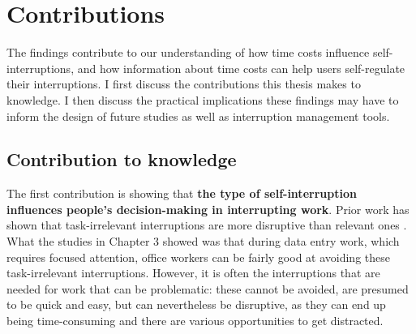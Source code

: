 \section{Contributions}
The findings contribute to our understanding of how time costs influence self-interruptions, and how information about time costs can help users self-regulate their interruptions. I first discuss the contributions this thesis makes to knowledge. I then discuss the practical implications these findings may have to inform the design of future studies as well as interruption management tools. 






\subsection{Contribution to knowledge}
The first contribution is showing that \textbf{the type of self-interruption influences people’s decision-making in interrupting work}. Prior work has shown that task-irrelevant interruptions are more disruptive than relevant ones \citep{Iqbal2008}. What the studies in Chapter 3 showed was that during data entry work, which requires focused attention, office workers can be fairly good at avoiding these task-irrelevant interruptions. However, it is often the interruptions that are needed for work that can be problematic: these cannot be avoided, are presumed to be quick and easy,  but can nevertheless be disruptive, as they can end up being time-consuming and there are various opportunities to get distracted. 

